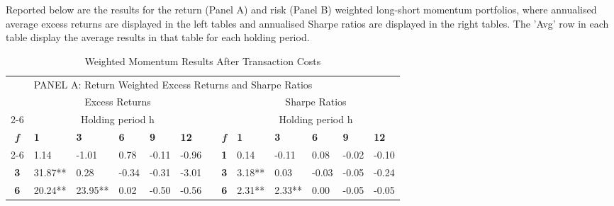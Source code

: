 \documentclass{article}
\begin{document}
\begin{table}[htbp!]
  \centering
  \toprule
  \caption{Weighted Momentum Results After Transaction Costs}
  Reported below are the results for the return (Panel A) and risk (Panel B) weighted long-short momentum portfolios, where annualised average excess returns are displayed in the left tables and annualised Sharpe ratios are displayed in the right tables. The ’Avg’ row in each table display the average results in that table for each holding period.
  \begin{adjustwidth}{-1.25cm}{}
    \begin{tabular}{rrrrrrrrrrrrr}
          &       &       &       &       &       &       &       &       &       &       &       &  \\
    \midrule
          & \multicolumn{12}{l}{PANEL A: Return Weighted Excess Returns and Sharpe Ratios} \\
    \midrule
          & \multicolumn{5}{c}{Excess Returns}    &       &       & \multicolumn{5}{c}{Sharpe Ratios} \\
\cmidrule{2-6}\cmidrule{9-13}          & \multicolumn{5}{c}{Holding period h}  &       &       & \multicolumn{5}{c}{Holding period h} \\
    \multicolumn{1}{c}{\textit{\textbf{f}}} & \multicolumn{1}{l}{\textbf{1}} & \multicolumn{1}{l}{\textbf{3}} & \multicolumn{1}{l}{\textbf{6}} & \multicolumn{1}{l}{\textbf{9}} & \multicolumn{1}{l}{\textbf{12}} &       & \multicolumn{1}{c}{\textit{\textbf{f}}} & \multicolumn{1}{l}{\textbf{1}} & \multicolumn{1}{l}{\textbf{3}} & \multicolumn{1}{l}{\textbf{6}} & \multicolumn{1}{l}{\textbf{9}} & \multicolumn{1}{l}{\textbf{12}} \\
\cmidrule{2-6}\cmidrule{9-13}    \multicolumn{1}{c}{\textbf{1}} & \multicolumn{1}{l}{1.14} & \multicolumn{1}{l}{-1.01} & \multicolumn{1}{l}{0.78} & \multicolumn{1}{l}{-0.11} & \multicolumn{1}{l}{-0.96} &       & \multicolumn{1}{c}{\textbf{1}} & \multicolumn{1}{l}{0.14} & \multicolumn{1}{l}{-0.11} & \multicolumn{1}{l}{0.08} & \multicolumn{1}{l}{-0.02} & \multicolumn{1}{l}{-0.10} \\
    \multicolumn{1}{c}{\textbf{3}} & \multicolumn{1}{l}{31.87**} & \multicolumn{1}{l}{0.28} & \multicolumn{1}{l}{-0.34} & \multicolumn{1}{l}{-0.31} & \multicolumn{1}{l}{-3.01} &       & \multicolumn{1}{c}{\textbf{3}} & \multicolumn{1}{l}{3.18**} & \multicolumn{1}{l}{0.03} & \multicolumn{1}{l}{-0.03} & \multicolumn{1}{l}{-0.05} & \multicolumn{1}{l}{-0.24} \\
    \multicolumn{1}{c}{\textbf{6}} & \multicolumn{1}{l}{20.24**} & \multicolumn{1}{l}{23.95**} & \multicolumn{1}{l}{0.02} & \multicolumn{1}{l}{-0.50} & \multicolumn{1}{l}{-0.56} &       & \multicolumn{1}{c}{\textbf{6}} & \multicolumn{1}{l}{2.31**} & \multicolumn{1}{l}{2.33**} & \multicolumn{1}{l}{0.00} & \multicolumn{1}{l}{-0.05} & \multicolumn{1}{l}{-0.05} \\

\end{tabular}
\end{adjustwidth}
\end{table}
\end{document}
